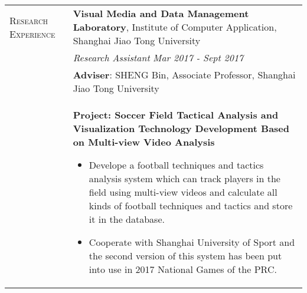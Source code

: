 \documentclass{article}
\begin{document}
\begin{tabular}{p{2.5cm}p{16cm}}
    {\textsc{Research \quad\quad Experience}} & \textbf{Visual Media and Data Management Laboratory}, Institute of Computer Application, Shanghai Jiao Tong University\\
    &\textit{Research Assistant} \hfill \textit{Mar 2017 - Sept 2017}\\
    &\textbf{Adviser}: SHENG Bin, Associate Professor, Shanghai Jiao Tong University\\
    &\textbf{Project: Soccer Field Tactical Analysis and Visualization Technology Development Based on Multi-view Video Analysis}
    \begin{itemize}[leftmargin=1em, topsep=0.5em]
        \setlength{\itemsep}{0pt}
        \setlength{\parsep}{0pt}
        \setlength{\parskip}{0pt}
        \item Develope a football techniques and tactics analysis system which can track players in the field using multi-view videos and calculate all kinds of football techniques and tactics and store it in the database.
        \item Cooperate with Shanghai University of Sport and the second version of this system has been put into use in 2017 National Games of the PRC.
    \end{itemize} \\
    

\end{tabular}
\end{document}
